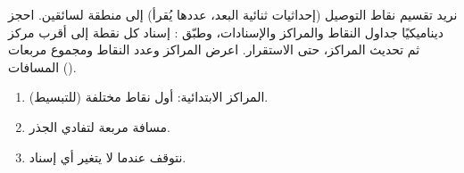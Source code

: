 \begin{statement}
نريد تقسيم نقاط التوصيل (إحداثيات ثنائية البعد، عددها يُقرأ) إلى  منطقة لسائقين. احجز ديناميكيًا جداول النقاط والمراكز والإسنادات، وطبّق \textbf{}: إسناد كل نقطة إلى أقرب مركز ثم تحديث المراكز، حتى الاستقرار. اعرض المراكز وعدد النقاط ومجموع مربعات المسافات ().
\end{statement}
\begin{stepsbox}\begin{enumerate}
\item المراكز الابتدائية: أول  نقاط مختلفة (للتبسيط).
\item مسافة مربعة لتفادي الجذر.
\item نتوقف عندما لا يتغير أي إسناد.
\end{enumerate}\end{stepsbox}
